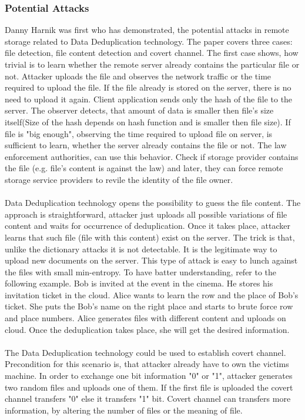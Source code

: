 \documentclass[12pt]{article}
\begin{document}
\subsubsection{Potential Attacks}
\label{subsub:TypesOfDedup}
Danny Harnik was first who has demonstrated, the potential attacks in remote storage related to Data Deduplication technology.\cite{Harnik} The paper covers three cases: file detection, file content detection and covert channel. The first case shows, how  trivial is  to learn whether the remote server already contains the particular file or not. Attacker uploads the file and observes the network traffic or the time required to upload the file. If the file already is stored on the server, there is no need to upload it again. Client application sends only the 
hash of the file to the server. The observer detects, that amount of data is smaller then file's size itself(Size of the hash depends on hash function and is smaller then file size). If file is "big enough", observing the time required to upload file on server, is sufficient to learn, whether the server already contains the file or not. The law enforcement authorities, can use this behavior. Check if storage provider contains the file (e.g. file's content is against the law) and later, they can force remote storage service providers to revile the identity of the file owner.\\\\
Data Deduplication technology opens the possibility to guess the file content. The approach is straightforward, attacker just uploads all possible variations of file content and waits for occurrence of deduplication. Once it takes place, attacker learns that such file (file with this content) exist on the server. The trick is that, unlike the dictionary attacks it is not detectable. It is the legitimate way to upload new documents on the server.\cite{Harnik} This type of attack is easy to lunch against the files with small min-entropy. To have batter understanding, refer to the following example. Bob is invited at the event in the cinema. He stores his invitation ticket in the cloud. Alice wants to learn the row and the place of Bob's ticket. She puts the Bob's name on the right place and  starts to brute force row and place numbers. Alice generates files with different content and uploads on cloud. Once the deduplication takes place, she will get the desired information.\\\\
The Data Deduplication technology could be used to establish covert channel. Precondition for this scenario is, that attacker already have to own the victims machine. In order to exchange one bit information "0" or "1", attacker generates two random files  and uploads one of them. If the first file is uploaded the covert channel transfers "0" else it transfers "1" bit. Covert channel can transfers more information, by altering  the number of files or the meaning of file.\cite{Harnik}\\\\
\end{document}
